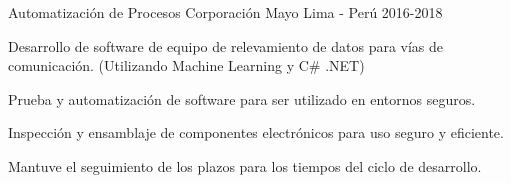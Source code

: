 \begin{cventries}
  \cventry
  {Automatizaci\'on de Procesos} %
  {Corporaci\'on Mayo} %
  {Lima - Per\'u} %
  {2016-2018} %
  {
    \begin{cvitems} %
      \item {Desarrollo de software de equipo de relevamiento de datos para v\'ias de comunicaci\'on. (Utilizando Machine Learning y C\# .NET)}
      \item {Prueba y automatizaci\'on de software para ser utilizado en entornos seguros.}
      \item {Inspecci\'on y ensamblaje de componentes electr\'onicos para uso seguro y eficiente.}
      \item {Mantuve el seguimiento de los plazos para los tiempos del ciclo de desarrollo.}
    \end{cvitems}
  }

\end{cventries}
